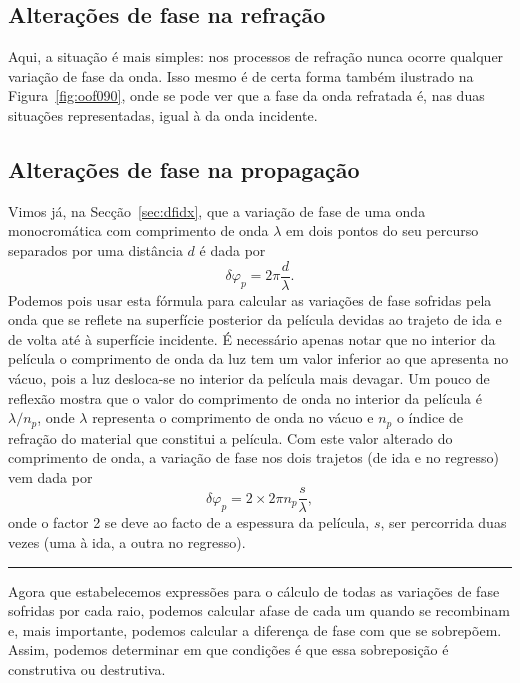 \subsection*{Alterações de fase na refração}
Aqui, a situação é mais simples: nos processos de refração nunca ocorre qualquer
variação de fase da onda. Isso mesmo é de certa forma também ilustrado na
Figura~\ref{fig:oof090}, onde se pode ver que a fase da onda refratada é, nas
duas situações representadas, igual à da onda incidente.

\subsection*{Alterações de fase na propagação}
Vimos já, na Secção~\ref{sec:dfidx}, que a variação de fase de uma onda
monocromática com comprimento de onda $\lambda$ em dois pontos do seu percurso
separados por uma distância $d$ é dada por
\begin{equation*}
    \delta\varphi_p=2\pi\frac{d}{\lambda}.
\end{equation*}
Podemos pois usar esta fórmula para calcular as variações de fase sofridas pela
onda que se reflete na superfície posterior da película devidas ao trajeto de
ida e de volta até à superfície incidente. É necessário apenas notar que no
interior da película o comprimento de onda da luz tem um valor inferior ao que
apresenta no vácuo, pois a luz desloca-se no interior da película mais devagar.
Um pouco de reflexão mostra que o valor do comprimento de onda no interior da
película é $\lambda/n_p$, onde $\lambda$ representa o comprimento de onda no
vácuo e $n_p$ o índice de refração do material que constitui a película. Com
este valor alterado do comprimento de onda, a variação de fase nos dois
trajetos (de ida e no regresso) vem dada por
\begin{equation*}
\delta\varphi_p=2\times2\pi n_p\frac{s}{\lambda},
\end{equation*}
onde o factor 2 se deve ao facto de a espessura da película, $s$, ser percorrida
duas vezes (uma à ida, a outra no regresso).
\begin{center}
    \rule{2cm}{0.1mm}
\end{center}

Agora que estabelecemos expressões para o cálculo de todas as variações de fase
sofridas por cada raio, podemos calcular afase de cada um quando se recombinam
e, mais importante, podemos calcular a diferença de fase com que se sobrepõem.
Assim, podemos determinar em que condições é que essa sobreposição é construtiva
ou destrutiva.

